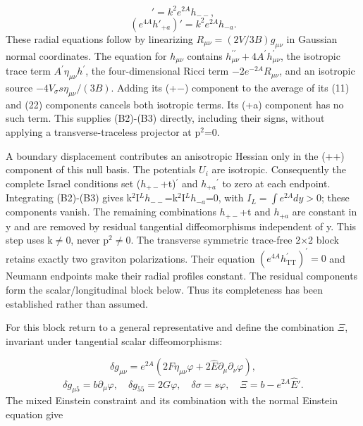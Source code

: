 \documentclass[11pt,a4paper]{article}
\begin{document}
\begin{equation}
[e^{4A}(h_{+-}+t)']'=k^2e^{2A}h_{--},\tag{B2}
\end{equation}
\begin{equation}
(e^{4A}h'_{+a})'=k^2e^{2A}h_{-a}.\tag{B3}
\end{equation}
These radial equations follow by linearizing \ensuremath{R_{\mu\nu}=(2V/3B)g_{\mu\nu}} in Gaussian normal coordinates. The equation for \ensuremath{h_{\mu\nu}} contains \ensuremath{h_{\mu\nu}^{\prime\prime}+4A^{\prime}h_{\mu\nu}^{\prime}}, the isotropic trace term \ensuremath{A^{\prime}\eta_{\mu\nu}h^{\prime}}, the four-dimensional Ricci term \ensuremath{-2e^{-2A}R_{\mu\nu}}, and an isotropic source \ensuremath{-4V_\sigma s\eta_{\mu\nu}/(3B)}. Adding its (+\ensuremath{-}) component to the average of its (11) and (22) components cancels both isotropic terms. Its (+a) component has no such term. This supplies (B2)-(B3) directly, including their signs, without applying a transverse-traceless projector at p\ensuremath{{}^{2}}=0.

A boundary displacement contributes an anisotropic Hessian only in the (++) component of this null basis. The potentials \ensuremath{U_i} are isotropic. Consequently the complete Israel conditions set (\ensuremath{h_{+-}}+t)\ensuremath{{}^{\prime}} and \ensuremath{h_{+a}}\ensuremath{{}^{\prime}} to zero at each endpoint. Integrating (B2)-(B3) gives k\ensuremath{{}^{2}}I\ensuremath{{}^{L}}\ensuremath{h_{--}}=k\ensuremath{{}^{2}}I\ensuremath{{}^{L}}\ensuremath{h_{-a}}=0, with \ensuremath{I_L=\int e^{2A}dy>0}; these components vanish. The remaining combinations \ensuremath{h_{+-}}+t and \ensuremath{h_{+a}} are constant in y and are removed by residual tangential diffeomorphisms independent of y. This step uses k\ensuremath{\ne}0, never p\ensuremath{{}^{2}}\ensuremath{\ne}0. The transverse symmetric trace-free 2\ensuremath{\times}2 block retains exactly two graviton polarizations. Their equation \ensuremath{(e^{4A}h_{\mathrm{TT}}^{\prime})^{\prime}=0} and Neumann endpoints make their radial profiles constant. The residual components form the scalar/longitudinal block below. Thus its completeness has been established rather than assumed.

For this block return to a general representative and define the combination \ensuremath{\Xi}, invariant under tangential scalar diffeomorphisms:

\begin{equation}
\delta g_{\mu\nu}=e^{2A}(2F\eta_{\mu\nu}\varphi+2\widehat E\partial_\mu\partial_\nu\varphi),\tag{B4}
\end{equation}
\begin{equation}
\delta g_{\mu5}=b\partial_\mu\varphi,\quad\delta g_{55}=2G\varphi,\quad\delta\sigma=s\varphi,\quad\Xi=b-e^{2A}\widehat E'.\tag{B5}
\end{equation}
The mixed Einstein constraint and its combination with the normal Einstein equation give
\end{document}
